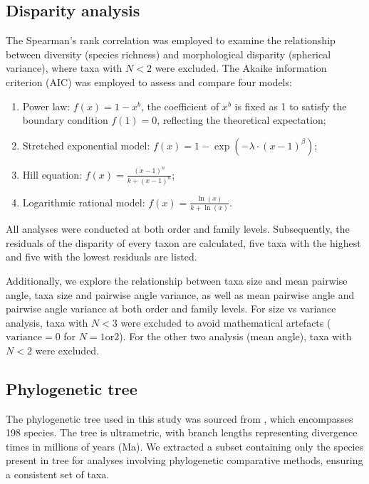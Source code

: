 \subsection{Disparity analysis}\label{subsec:mm-disparity-analysis}

The Spearman's rank correlation was employed to examine
the relationship between diversity (species richness) and morphological
disparity (spherical variance), where taxa with $N<2$ were excluded. The Akaike
information criterion (AIC) was employed to assess and compare four models:

\begin{enumerate}
    \item Power law: $f(x) = 1 - x^b$, the coefficient of $x^b$
        is fixed as 1 to satisfy the boundary condition $f(1) = 0$,
        reflecting the theoretical expectation;
    \item Stretched exponential model: $f(x) = 1 - \exp(-\lambda \cdot (x - 1)^\beta)$;
    \item Hill equation: $f(x) = \frac{(x - 1)^n}{k + (x - 1)^n}$;
    \item Logarithmic rational model: $f(x) = \frac{\ln(x)}{k + \ln(x)}$.
\end{enumerate}

All analyses were conducted at both order and family levels. Subsequently, the residuals
of the disparity of every taxon are calculated, five taxa with the highest and five with
the lowest residuals are listed.

Additionally, we explore the relationship between taxa size and mean pairwise angle,
taxa size and pairwise angle variance, as well as mean pairwise angle and pairwise
angle variance at both order and family levels. For size vs variance analysis,
taxa with $N<3$ were excluded to avoid mathematical artefacts
($\text{variance} = 0$ for $N=1 \text{or} 2$). For the other two analysis (mean angle),
taxa with $N<2$ were excluded.

\subsection{Phylogenetic tree}\label{subsec:mm-phylogenetic-tree}

The phylogenetic tree used in this study was sourced from \textcite{Stiller2024Complexity}, which encompasses 198 species. The tree is ultrametric, with branch lengths representing divergence times in millions of years (Ma). We extracted a subset containing only the species present in  tree for analyses involving phylogenetic comparative methods, ensuring a consistent set of taxa. 

